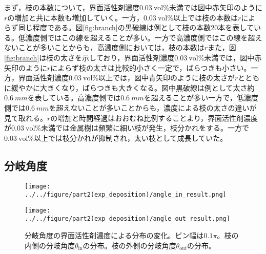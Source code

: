 \documentclass[autodetect-engine,dvi=dvipdfmx,a4paper,ja=standard,oneside,openany,11pt]{bxjsbook}
\begin{document}
まず，枝の本数について，界面活性剤濃度$\SI{0.03}{\mathrm{vol}\%}$未満では図中赤矢印のように$r$の増加と共に本数も増加していく。一方，$\SI{0.03}{\mathrm{vol}\%}$以上では枝の本数は$r$によらず同じ程度である。図\ref{fig:branch}の黒破線は例として枝の本数20本を表している。低濃度側ではこの線を超えることが多い。一方で高濃度側ではこの線を超えないことが多いことからも，高濃度側においては，枝の本数は$r$また，図\ref{fig:branch}は枝の太さを示しており，界面活性剤濃度$\SI{0.03}{\mathrm{vol}\%}$未満では，図中赤矢印のように$r$によらず枝の太さは比較的小さく一定で，ばらつきも小さい。一方，界面活性剤濃度$\SI{0.03}{\mathrm{vol}\%}$以上では，図中青矢印のように枝の太さが$r$とともに緩やかに大きくなり，ばらつきも大きくなる。図中黒破線は例として太さ約$\SI{0.6}{mm}$を表している。高濃度側では$\SI{0.6}{mm}$を超えることが多い一方で，低濃度側では$\SI{0.6}{mm}$を超えないことが多いことからも，濃度による枝の太さの違いが見て取れる。$r$の増加と時間経過はおおむね比例することより，界面活性剤濃度が$\SI{0.03}{\mathrm{vol}\%}$未満では金属樹は頻繁に細い枝が発生，枝分かれをする。一方で$\SI{0.03}{\mathrm{vol}\%}$以上では枝分かれが抑制され，太い枝として成長していた。

\subsection{分岐角度}

\begin{figure}[htbp]
  \begin{minipage}
    {0.5\textwidth}
    \subcaption{}
    \centering
    \texttt{[image: ../../figure/part2(exp\_deposition)/angle\_in\_result.png]}
    \label{fig:angle_in}
  \end{minipage}
  \begin{minipage}
    {0.45\textwidth}
    \subcaption{}
    \centering
    \texttt{[image: ../../figure/part2(exp\_deposition)/angle\_out\_result.png]}
    \label{fig:angle_out}
  \end{minipage}
  \caption{分岐角度の界面活性剤濃度による分布の変化。ビン幅は$0.1\pi$。枝の内側の分岐角度$\theta_{\mathrm{in}}$の分布。枝の外側の分岐角度$\theta_{\mathrm{out}}$の分布。}
  \label{fig:angle}
\end{figure}
\end{document}
